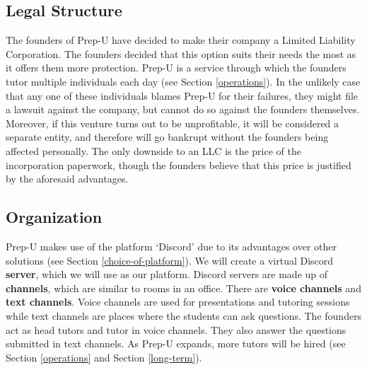\documentclass{business}
\begin{document}
    \subsection{Legal Structure}
    The founders of Prep-U have decided to make their company a Limited Liability Corporation. The founders decided that this option suits their needs the most as it offers them more protection. Prep-U is a service through which the founders tutor multiple individuals each day (see Section \ref{operations}). In the unlikely case that any one of these individuals blames Prep-U for their failures, they might file a lawsuit against the company, but cannot do so against the founders themselves. Moreover, if this venture turns out to be unprofitable, it will be considered a separate entity, and therefore will go bankrupt without the founders being affected personally. The only downside to an LLC is the price of the incorporation paperwork, though the founders believe that this price is justified by the aforesaid advantages.
    \subsection{Organization}
    Prep-U makes use of the platform `Discord' due to its advantages over other solutions (see Section \ref{choice-of-platform}). We will create a virtual Discord \textbf{server}, which we will use as our platform. Discord servers are made up of \textbf{channels}, which are similar to rooms in an office. There are \textbf{voice channels} and \textbf{text channels}. Voice channels are used for presentations and tutoring sessions while text channels are places where the students can ask questions. The founders act as head tutors and tutor in voice channels. They also answer the questions submitted in text channels. As Prep-U expands, more tutors will be hired (see Section \ref{operations} and Section \ref{long-term}). 
\end{document}
